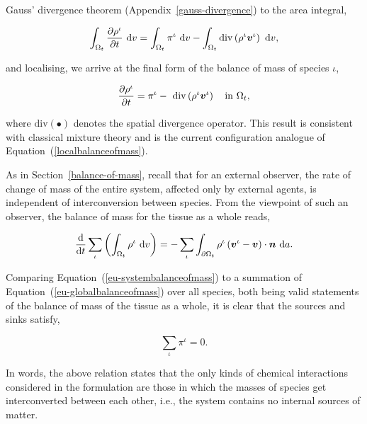 \noindent Gauss' divergence theorem (Appendix~\ref{gauss-divergence})
to the area integral,

\begin{equation*}
\int_{\Omega_{t}} \frac{\partial \rho^{\iota}}{\partial t}
\ \mathrm{d}v = \int_{\Omega_{t}} \pi^{\iota} \ \mathrm{d}v -
\int_{\Omega_{t}} \mathrm{div} \left( \rho^{\iota} \mbox{\boldmath$ v$}^{\iota}\right)
\ \mathrm{d}v,
\end{equation*}

\noindent and localising, we arrive at the final form of the balance
of mass of species $\iota$,

\begin{equation}
\frac{\partial \rho^{\iota}}{\partial t} = \pi^{\iota} -\ \mathrm{div}
\left(\rho^{\iota} \mbox{\boldmath$ v$}^{\iota}\right) \quad \mathrm{in}\ \Omega_{t},
\label{eu-localbalanceofmass}
\end{equation}

\noindent where $\mathrm{div} (\bullet)$ denotes the spatial
divergence operator. This result is consistent with classical mixture
theory \citep{TruesdellToupin:60} and is the current configuration
analogue of Equation~(\ref{localbalanceofmass}).

As in Section~\ref{balance-of-mass}, recall that for an external
observer, the rate of change of mass of the entire system, affected
only by external agents, is independent of interconversion between
species. From the viewpoint of such an observer, the balance of mass
for the tissue as a whole reads,

\begin{equation}
\frac{\mathrm{\mathrm{d}}}{\mathrm{\mathrm{d}}t} \sum\limits_{\iota}
\left(\int_{\Omega_{t}} \rho^{\iota} \ \mathrm{d}v \right) =
-\sum\limits_{\iota} \int_{\partial \Omega_{t}} \rho^{\iota}
\left(\mbox{\boldmath$ v$}^{\iota} - \mbox{\boldmath$ v$}\right) \cdot \mbox{\boldmath$ n$}\ \mathrm{d}a.
\label{eu-systembalanceofmass}
\end{equation}

\noindent Comparing Equation~(\ref{eu-systembalanceofmass}) to a
summation of Equation~(\ref{eu-globalbalanceofmass}) over all species,
both being valid statements of the balance of mass of the tissue as a
whole, it is clear that the sources and sinks satisfy,

\begin{equation}
\sum\limits_{\iota}\pi^{\iota} = 0.
\label{eu-summationrelationmass}
\end{equation}

\noindent In words, the above relation states that the only kinds of
chemical interactions considered in the formulation are those in which
the masses of species get interconverted between each other, i.e.,
the system contains no internal sources of matter.

